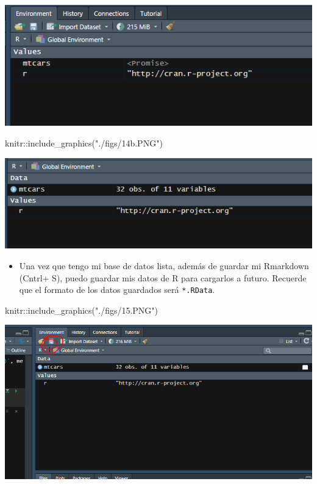 \documentclass[
]{article}
\newenvironment{Shaded}{}{}
\newcommand{\FunctionTok}[1]{\textcolor[rgb]{0.02,0.16,0.49}{#1}}
\newcommand{\NormalTok}[1]{#1}
\newcommand{\SpecialCharTok}[1]{\textcolor[rgb]{0.25,0.44,0.63}{#1}}
\newcommand{\StringTok}[1]{\textcolor[rgb]{0.25,0.44,0.63}{#1}}
\providecommand{\tightlist}{%
  \setlength{\itemsep}{0pt}\setlength{\parskip}{0pt}}
\begin{document}
\begin{center}\includegraphics[width=0.6\linewidth]{./figs/14a} \end{center}

\begin{Shaded}
\begin{Highlighting}[]
\NormalTok{knitr}\SpecialCharTok{::}\FunctionTok{include\_graphics}\NormalTok{(}\StringTok{"./figs/14b.PNG"}\NormalTok{)}
\end{Highlighting}
\end{Shaded}

\begin{center}\includegraphics[width=0.6\linewidth]{./figs/14b} \end{center}

\begin{itemize}
\tightlist
\item
  Una vez que tengo mi base de datos lista, además de guardar mi
  Rmarkdown (Cntrl+ S), puedo guardar mis datos de R para cargarlos a
  futuro. Recuerde que el formato de los datos guardados será
  \texttt{*.RData}.
\end{itemize}

\begin{Shaded}
\begin{Highlighting}[]
\NormalTok{knitr}\SpecialCharTok{::}\FunctionTok{include\_graphics}\NormalTok{(}\StringTok{"./figs/15.PNG"}\NormalTok{)}
\end{Highlighting}
\end{Shaded}

\begin{center}\includegraphics[width=0.6\linewidth]{./figs/15} \end{center}
\end{document}
